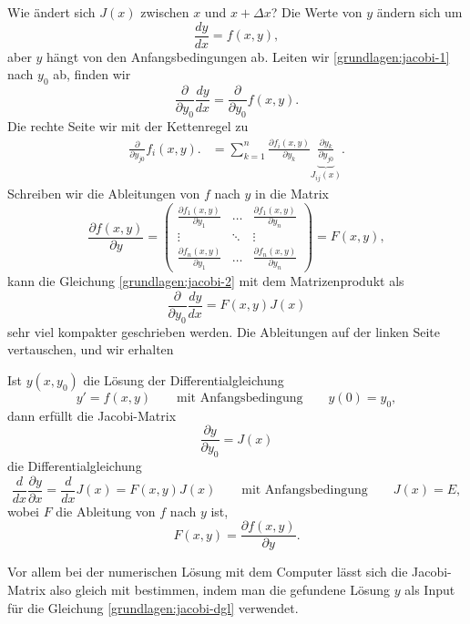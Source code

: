 Wie ändert sich $J(x)$ zwischen $x$ und $x+\Delta x$?
Die Werte von $y$ ändern sich um
\begin{equation}
\frac{dy}{dx}= f(x,y),
\label{grundlagen:jacobi-1}
\end{equation}
aber $y$ hängt von den Anfangsbedingungen ab.
Leiten wir \eqref{grundlagen:jacobi-1} nach $y_0$ ab, finden wir
\begin{equation}
\frac{\partial}{\partial y_0}\frac{dy}{dx}
=
\frac{\partial}{\partial y_0}f(x,y).
\label{grundlagen:jacobi-2}
\end{equation}
Die rechte Seite wir mit der Kettenregel zu
\begin{align*}
\frac{\partial}{\partial y_{j0}}f_i(x,y).
&=
\sum_{k=1}^n \frac{\partial f_i(x,y)}{\partial y_{k}}
\underbrace{\frac{\partial y_k}{\partial y_{j0}}}_{\displaystyle J_{ij}(x)}.
\end{align*}
Schreiben wir die Ableitungen von $f$ nach $y$ in die Matrix
\[
\frac{\partial f(x,y)}{\partial y}
=
\begin{pmatrix}
\displaystyle\frac{\partial f_1(x,y)}{\partial y_1}&\dots&
	\displaystyle\frac{\partial f_1(x,y)}{\partial y_n}\\
\vdots&\ddots&\vdots\\
\displaystyle\frac{\partial f_n(x,y)}{\partial y_1}&\dots&
	\displaystyle\frac{\partial f_n(x,y)}{\partial y_n}
\end{pmatrix}
=F(x,y),
\]
kann die Gleichung \eqref{grundlagen:jacobi-2} mit dem Matrizenprodukt als
\begin{equation*}
\frac{\partial}{\partial y_0}\frac{dy}{dx}
=
F(x,y)J(x)
\end{equation*}
sehr viel kompakter geschrieben werden.
Die Ableitungen auf der linken Seite vertauschen, und wir erhalten

\begin{satz}
Ist $y(x,y_0)$ die Lösung der Differentialgleichung 
\[
y'=f(x,y)\qquad\text{mit Anfangsbedingung}\qquad y(0)=y_0,
\]
dann erfüllt die Jacobi-Matrix 
\[
\frac{\partial y}{\partial y_0}=J(x)
\]
die Differentialgleichung
\begin{equation}
\frac{d}{dx}\frac{\partial y}{\partial x}
=
\frac{d}{dx}J(x)
=
F(x,y)J(x)
\qquad
\text{mit Anfangsbedingung}
\qquad
J(x)=E,
\label{grundlagen:jacobi-dgl}
\end{equation}
wobei $F$ die Ableitung von $f$ nach $y$ ist,
\[
F(x,y)=\frac{\partial f(x,y)}{\partial y}.
\]
\end{satz}
Vor allem bei der numerischen Lösung mit dem Computer lässt sich
die Jacobi-Matrix also gleich mit bestimmen, indem man die gefundene
Lösung $y$ als Input für die Gleichung \eqref{grundlagen:jacobi-dgl}
verwendet.

